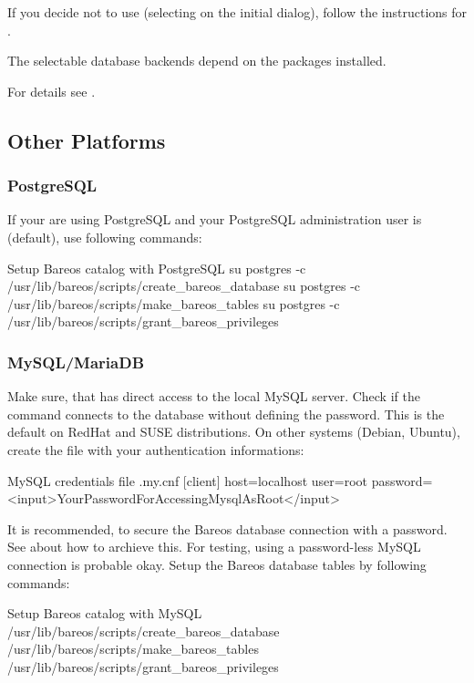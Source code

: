If you decide not to use  (selecting  on the initial dialog), 
follow the instructions for .

The selectable database backends depend on the  packages installed.

For details see .

\subsection{Other Platforms}
    \label{sec:CreateDatabaseOtherDistributions}

\subsubsection{PostgreSQL}
If your are using PostgreSQL and your PostgreSQL administration user is  (default), use following commands:

\begin{commands}{Setup Bareos catalog with PostgreSQL}
su postgres -c /usr/lib/bareos/scripts/create_bareos_database
su postgres -c /usr/lib/bareos/scripts/make_bareos_tables
su postgres -c /usr/lib/bareos/scripts/grant_bareos_privileges
\end{commands}


\subsubsection{MySQL/MariaDB}
Make sure, that  has direct access to the local MySQL server. 
Check if the command  connects to the database without defining the password.
This is the default on RedHat and SUSE distributions. 
On other systems (Debian, Ubuntu),
create the file  with your authentication informations:

\begin{config}{MySQL credentials file .my.cnf}
[client]
host=localhost
user=root
password=<input>YourPasswordForAccessingMysqlAsRoot</input>
\end{config}

It is recommended, to secure the Bareos database connection with a password.
See  about how to archieve this.
For testing, using a password-less MySQL connection is probable okay.
Setup the Bareos database tables by following commands:
\begin{commands}{Setup Bareos catalog with MySQL}
/usr/lib/bareos/scripts/create_bareos_database
/usr/lib/bareos/scripts/make_bareos_tables
/usr/lib/bareos/scripts/grant_bareos_privileges
\end{commands}

